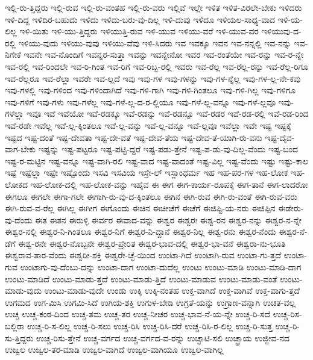 {ಇಲ್ಲಿ-ರು-ತ್ತಿದ್ದರು
ಇಲ್ಲಿ-ರುವ
ಇಲ್ಲಿ-ರು-ವಂತಹ
ಇಲ್ಲಿ-ರು-ವರು
ಇಲ್ಲಿವೆ
ಇಲ್ಲೇ
ಇಳಿತ
ಇಳಿತ-ವಿರಲೇ-ಬೇಕು
ಇಳಿದರು
ಇಳಿ-ದಿದ್ದ
ಇಳಿದಿರ-ಬಹುದು
ಇಳಿದು
ಇಳಿದು-ಬರು-ವು-ದಿಲ್ಲ
ಇಳಿ-ದುವು
ಇಳಿದೂ
ಇಳಿಯಲ-ಸಾಧ್ಯ-ವಾದ
ಇಳಿ-ಯ-ಲಿಲ್ಲ
ಇಳಿ-ಯಿತು
ಇಳಿ-ಯು-ತ್ತಿದ್ದರು
ಇಳಿಯುತ್ತಿ-ರುವ
ಇಳಿ-ಯುವ
ಇಳಿಯು-ವರೆ
ಇಳಿ-ಯುವ-ವರ
ಇಳಿಯುವು-ದ-ರಲ್ಲಿ
ಇಳಿಯು-ವುದು
ಇಳಿಯು-ವುವು
ಇಳಿಯು-ವೆವು
ಇಳಿ-ಸಿದರು
ಇವ
ಇವಕ್ಕೂ
ಇವನ
ಇವ-ನನ್ನಲ್ಲಿ
ಇವ-ನನ್ನು
ಇವ-ನಿಗೇಕೆ
ಇವನೇ
ಇವ-ನೊಂದಿಗೆ
ಇವನ್ನರ-ಸುತ್ತಾ
ಇವನ್ನು
ಇವನ್ನೇನೋ
ಇವರ
ಇವ-ರಂತೆಯೇ
ಇವ-ರನ್ನು
ಇವ-ರ-ನ್ನೇ
ಇವ-ರಲ್ಲಿ
ಇವ-ರಿಂದಲೇ
ಇವ-ರಿ-ಗಿಂತ
ಇವ-ರಿಗೆ
ಇವ-ರಿಬ್ಬ-ರಲ್ಲಿ
ಇವರು
ಇವ-ರೆಲ್ಲ
ಇವ-ರೆಲ್ಲ-ರನ್ನು
ಇವ-ರೆಲ್ಲ-ರಿಗೂ
ಇವ-ರೆಲ್ಲರೂ
ಇವ-ರೆಲ್ಲಾ
ಇವರೇ
ಇವ-ಲ್ಲದೆ
ಇವು
ಇವು-ಗಳ
ಇವು-ಗಳನ್ನು
ಇವು-ಗಳ-ನ್ನೆಲ್ಲ
ಇವು-ಗಳ-ಲ್ಲ-ನೇ-ಕವು
ಇವು-ಗಳಲ್ಲಿ
ಇವು-ಗಳಿಂದ
ಇವು-ಗಳಿಂದಾಗಿದೆ
ಇವು-ಗಳಿ-ಗಾಗಿ
ಇವು-ಗಳಿ-ಗಿಂತಲೂ
ಇವು-ಗಳಿ-ಗಿಲ್ಲ
ಇವು-ಗಳಿಗೂ
ಇವು-ಗಳಿಗೆ
ಇವು-ಗಳು
ಇವು-ಗಳೆಲ್ಲ
ಇವು-ಗಳೆ-ಲ್ಲ-ದ-ರ-ಲ್ಲಿಯೂ
ಇವು-ಗಳೆ-ಲ್ಲ-ವನ್ನೂ
ಇವು-ಗಳೆ-ಲ್ಲವೂ
ಇವು-ಗಳೆಲ್ಲಾ
ಇವೂ
ಇವೆ
ಇವೆಯೋ
ಇವೆ-ರಡಕ್ಕೂ
ಇವೆ-ರಡನ್ನು
ಇವೆ-ರಡನ್ನೂ
ಇವೆ-ರಡರ
ಇವೆ-ರಡ-ರಲ್ಲಿ
ಇವೆ-ರಡ-ರಿಂದ
ಇವೆ-ರಡೇ
ಇವೆಲ್ಲ
ಇವೆ-ಲ್ಲ-ಕ್ಕಿಂತಲೂ
ಇವೆ-ಲ್ಲ-ವನ್ನು
ಇವೆ-ಲ್ಲ-ವನ್ನೂ
ಇವೆ-ಲ್ಲವೂ
ಇವೆಲ್ಲಾ
ಇವೇ
ಇಷ್ಟ
ಇಷ್ಟಕ್ಕೆ
ಇಷ್ಟದ
ಇಷ್ಟ-ದಂತೆ
ಇಷ್ಟ-ದೇವತಾ
ಇಷ್ಟ-ದೇ-ವತೆ
ಇಷ್ಟ-ದೇವ-ತೆಯ
ಇಷ್ಟ-ದೇವ-ತೆ-ಯಾಗಿ-ರು-ವನು
ಇಷ್ಟ-ದೈವ-ವಾಗ-ಬೇಕು
ಇಷ್ಟನ್ನು
ಇಷ್ಟ-ಪಟ್ಟರೂ
ಇಷ್ಟ-ಪಟ್ಟಿ-ದ್ದರೆ
ಇಷ್ಟ-ಪಡು-ತ್ತೇನೆ
ಇಷ್ಟ-ಪ-ಡು-ವು-ದಿಲ್ಲ-ವೆಂದು
ಇಷ್ಟ-ಬಂದ
ಇಷ್ಟ-ರ-ಮಟ್ಟಿನ
ಇಷ್ಟ-ವನ್ನೂ
ಇಷ್ಟ-ವಾಗಿ-ರಲಿ
ಇಷ್ಟ-ವಾದ
ಇಷ್ಟ-ವಾದಂತೆ
ಇಷ್ಟ-ವಿಲ್ಲ
ಇಷ್ಟ-ವೆಂದು
ಇಷ್ಟು
ಇಷ್ಟು-ಕಾಲ
ಇಷ್ಟೆ
ಇಷ್ಟೆಲ್ಲಾ
ಇಷ್ಟೇ
ಇಷ್ಟೊಂದು
ಇಸವಿ
ಇಸವಿಯ
ಇಸ್ರೇ-ಲ್
ಇಸ್ಲಾಂಧರ್ಮ
ಇಹ
ಇಹ-ಪರ-ಗಳ
ಇಹ-ಲೋಕ
ಇಹ-ಲೋಕದ
ಇಹ-ಲೋಕ-ದಲ್ಲಿ
ಇಹ-ಲೋಕ-ವನ್ನು
ಇಹೈವ
ಈ
ಈಗ
ಈಗ-ಕಾರ್ಯ-ರೂಪಕ್ಕೆ
ಈಗ-ತಾನೆ
ಈಗ-ಲಾದರೋ
ಈಗಲೂ
ಈಗಲೇ
ಈಗಾ-ಗಲೇ
ಈಗಾಗಿ-ರು-ವು-ದ-ಕ್ಕಿಂತಲೂ
ಈಗಿನ
ಈಗಿ-ರುವ
ಈಗಿ-ರು-ವಂತೆ
ಈಗಿ-ರುವ-ವರು
ಈಗಿ-ರುವ-ವ-ರೆಲ್ಲ
ಈಗಿಲ್ಲ
ಈಗೀಗ
ಈಗೊಂದು
ಈಚಿನ
ಈಚೀಚೆಗೆ
ಈಚೆಗೆ
ಈಜಿಪ್ಟಿ-ಯ-ನರು
ಈಜಿಪ್ಪಿನ
ಈಡೇರು-ವು-ದೆಂದು
ಈತ
ಈತನ
ಈರುಳ್ಳಿ
ಈರ್ವರ
ಈವಾದ-ವನ್ನು
ಈಶ್ವರ
ಈಶ್ವರಃ
ಈಶ್ವ-ರನ
ಈಶ್ವರ-ನನ್ನು
ಈಶ್ವರ-ನ-ನ್ನೇ
ಈಶ್ವರ-ನಲ್ಲಿ
ಈಶ್ವರ-ನಿ-ಗಿಂತಲೂ
ಈಶ್ವರ-ನಿಗೆ
ಈಶ್ವರ-ನಿ-ದ್ದಾನೆ
ಈಶ್ವರ-ನಿಲ್ಲ
ಈಶ್ವ-ರನು
ಈಶ್ವರ-ನೆಂದು
ಈಶ್ವರ-ನೆ-ಡೆಗೆ
ಈಶ್ವ-ರನೇ
ಈಶ್ವರ-ನೊಬ್ಬನೇ
ಈಶ್ವರ-ಪ್ರೇರಿತ
ಈಶ್ವರ-ಭಾವ-ದಲ್ಲಿ
ಈಶ್ವರ-ಭಾ-ವನೆ
ಈಶ್ವರಾ-ನು-ಭೂತಿ
ಈಶ್ವರಾವ-ತಾರ-ವೆಂದು
ಈಶ್ವರೀ-ಶಕ್ತಿ
ಈಶ್ವರೇ-ಚ್ಛೆ-ಯಿಂದ
ಉಂಟಾ-ಗಿದೆ
ಉಂಟಾಗಿ-ರುವ
ಉಂಟಾ-ಗು-ತ್ತದೆ
ಉಂಟಾ-ಗುವ
ಉಂಟಾಗು-ವು-ದೆಂಬು-ದನ್ನು
ಉಂಟಾ-ದಾಗ
ಉಂಟಾ-ದುದೆಲ್ಲ
ಉಂಟು
ಉಂಟು-ಮಾಡಿ
ಉಂಟು-ಮಾಡಿ-ದಾಗ
ಉಂಟು-ಮಾಡಿದೆ
ಉಂಟು-ಮಾಡು-ತ್ತದೆ
ಉಂಟು-ಮಾಡು-ತ್ತಿದೆ
ಉಂಟು-ಮಾಡುವ
ಉಂಟು-ಮಾಡು-ವಂತೆ
ಉಂಟು-ಮಾಡು-ವುದು
ಉಂಟು-ಮಾಡು-ವುದೇ
ಉಂಡು
ಉಕ್ಕಿ
ಉಕ್ಕಿ-ನಂತಹ
ಉಕ್ತ-ವಾಗಿದೆ
ಉಕ್ತ-ವಾಗಿವೆ
ಉಕ್ತ-ವಾಗು-ತ್ತದೆ
ಉಗಮದ
ಉಗ-ಮಿಸಿ
ಉಗಮಿ-ಸಿದೆ
ಉಗಿಯ-ಶಕ್ತಿ
ಉಗುಳ-ಬೇಡಿ
ಉಗ್ರತೆ-ಯನ್ನು
ಉಗ್ರಾಣ-ವನ್ನಾಗಿ
ಉಚಿತ-ವಲ್ಲ
ಉಚ್ಚ
ಉಚ್ಚ-ಕಂಠ-ದಿಂದ
ಉಚ್ಚ-ತಮ
ಉಚ್ಚ-ತರ
ಉಚ್ಚ-ನೀಚರ
ಉಚ್ಚ-ಭಾವ-ನೆ-ಯ-ನ್ನೇ
ಉಚ್ಚ-ರಿ-ಸದೆ
ಉಚ್ಚ-ರಿಸ-ಬಲ್ಲಿರಾ
ಉಚ್ಚ-ರಿ-ಸ-ಲಿಲ್ಲ
ಉಚ್ಚ-ರಿ-ಸಲು
ಉಚ್ಚ-ರಿಸಿ
ಉಚ್ಚ-ರಿಸಿ-ದರೆ
ಉಚ್ಚ-ರಿಸಿ-ರ-ಲಿಲ್ಲ
ಉಚ್ಚ-ರಿ-ಸುತ್ತ
ಉಚ್ಚ-ರಿ-ಸು-ತ್ತಿದ್ದರು
ಉಚ್ಚ-ರಿಸು-ತ್ತೇನೆ
ಉಚ್ಚ-ವರ್ಗದ
ಉಚ್ಚ-ವರ್ಗದ-ವ-ರನ್ನು
ಉಚ್ಛಾಟಿ-ಸಲಿ
ಉಚ್ಛ್ರಾಯ
ಉಜ್ಜೀವ-ನದ
ಉಜ್ವಲ
ಉಜ್ವಲ-ತರ-ಮಾಡಿ
ಉಜ್ವಲ-ವಾಗಿದೆ
ಉಜ್ವಲ-ವಾಗಿಯೂ
ಉಜ್ವಲ-ವಾಗಿಲ್ಲ
}
